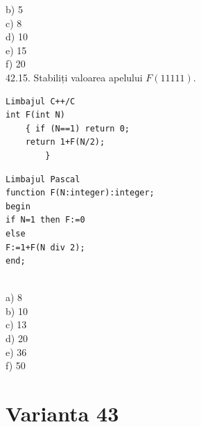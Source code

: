 \begin{itemize}
\begin{enumerate}
b) 5
\\
c) 8
\\
d) 10
\\
e) 15
\\
f) 20
\\
42.15. Stabiliți valoarea apelului $F(11111)$.
\begin{verbatim}
Limbajul C++/C
int F(int N)
    { if (N==1) return 0;
    return 1+F(N/2);
        }
\end{verbatim}
\begin{verbatim}
Limbajul Pascal
function F(N:integer):integer;
begin
if N=1 then F:=0
else
F:=1+F(N div 2);
end;
\end{verbatim}
\\
a) 8
\\
b) 10
\\
c) 13
\\
d) 20
\\
e) 36
\\
f) 50
\\

\section*{Varianta 43}


\end{enumerate}
\end{itemize}
